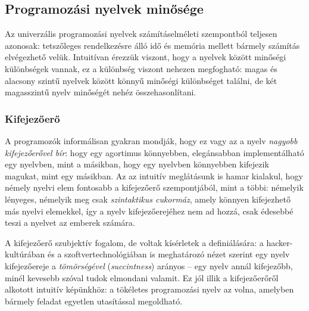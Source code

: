 \subsection{Programozási nyelvek minősége}
Az univerzális programozási nyelvek számításelméleti szempontból teljesen azonosak: tetszőleges rendelkezésre álló idő és memória mellett bármely számítás elvégezhető velük.
Intuitívan érezzük viszont, hogy a nyelvek között minőségi különbségek vannak, ez a különbség viszont nehezen megfogható: magas és alacsony szintű nyelvek között könnyű minőségi különbséget találni, de két magasszintű nyelv minőségét nehéz összehasonlítani.

\subsubsection{Kifejezőerő}
A programozók informálisan gyakran mondják, hogy ez vagy az a nyelv \textit{nagyobb kifejezőerővel bír}: hogy egy agortimus könnyebben, elegánsabban implementálható egy nyelvben, mint a másikban, hogy egy nyelvben könnyebben kifejezik magukat, mint egy másikban.
Az az intuitív meglátásunk is hamar kialakul, hogy némely nyelvi elem fontosabb a kifejezőerő szempontjából, mint a többi: némelyik lényeges, némelyik meg csak \textit{szintaktikus cukormáz}, amely könnyen kifejezhető más nyelvi elemekkel, így a nyelv kifejezőerejéhez nem ad hozzá, csak édesebbé teszi a nyelvet az emberek számára.\cite{Landin64}

A kifejezőerő szubjektív fogalom, de voltak kísérletek a definiálására: a hacker-kultúrában\cite{Graham02} és a szoftvertechnológiában\cite{MythManMonth}\cite{CodeComplete} is meghatározó nézet szerint egy nyelv kifejezőereje a \textit{tömörségével} (\textit{succintness}) arányos -- egy nyelv annál kifejezőbb, minél kevesebb szóval tudok elmondani valamit.
Ez jól illik a kifejezőerőről alkotott intuitív képünkhöz: a tökéletes programozási nyelv az volna, amelyben bármely feladat egyetlen utasítással megoldható.

